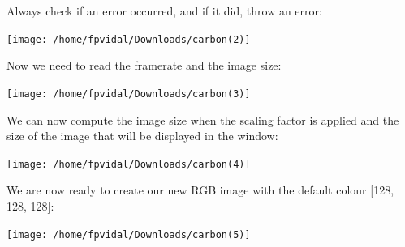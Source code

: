 \documentclass[english,a4paper,12pt,oneside]{article}
\begin{document}
Always check if an error occurred, and if it did, throw an error:

% 
\texttt{[image: /home/fpvidal/Downloads/carbon(2)]}

Now we need to read the framerate and the image size:

% 
% 
% 
\texttt{[image: /home/fpvidal/Downloads/carbon(3)]}



We can now compute the image size when the scaling factor is applied and the size of the image that will be displayed in the window:

% 
\texttt{[image: /home/fpvidal/Downloads/carbon(4)]}

We are now ready to create our new RGB image with the default colour [128, 128, 128]:

\texttt{[image: /home/fpvidal/Downloads/carbon(5)]}
\end{document}
